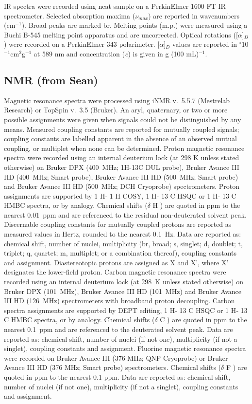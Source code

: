 IR spectra were recorded using neat sample on a PerkinElmer 1600 FT IR spectrometer. Selected absorption maxima ($\nu_{max}$) are reported in wavenumbers (cm$^{-1}$). Broad peaks are marked br.
Melting points (m.p.) were measured using a Buchi B-545 melting point apparatus and are uncorrected. 
Optical rotations ([$\alpha$]$_D$) were recorded on a PerkinElmer 343 polarimeter. [$\alpha$]$_D$ values are reported in $^{\circ}$10$^{-1}$cm$^2$g$^{-1}$ at 589 nm and concentration (\textit{c}) is given in g (100 mL)$^{-1}$. 

\subsection{NMR (from Sean)}

Magnetic resonance spectra were processed using iNMR v. 5.5.7 (Mestrelab Research) or
TopSpin v. 3.5 (Bruker). An aryl, quaternary, or two or more possible assignments were
given when signals could not be distinguished by any means. Measured coupling
constants are reported for mutually coupled signals; coupling constants are labelled
apparent in the absence of an observed mutual coupling, or multiplet when none can
be determined.
Proton magnetic resonance spectra were recorded using an internal deuterium lock (at
298 K unless stated otherwise) on Bruker DPX (400 MHz; 1H-13C DUL probe), Bruker
Avance III HD (400 MHz; Smart probe), Bruker Avance III HD (500 MHz; Smart probe)
and Bruker Avance III HD (500 MHz; DCH Cryoprobe) spectrometers. Proton assignments
are supported by 1 H‑ 1 H COSY, 1 H‑ 13 C HSQC or 1 H‑ 13 C HMBC spectra, or by analogy.
Chemical shifts ($\delta$ H ) are quoted in ppm to the nearest 0.01 ppm and are referenced to
the residual non‑deuterated solvent peak. Discernable coupling constants for mutually
coupled protons are reported as measured values in Hertz, rounded to the nearest
0.1 Hz. Data are reported as: chemical shift, number of nuclei, multiplicity (br, broad; s,
singlet; d, doublet; t, triplet; q, quartet; m, multiplet; or a combination thereof),
coupling constants and assignment. Diastereotopic protons are assigned as X and X’,
where X’ designates the lower‑field proton.
Carbon magnetic resonance spectra were recorded using an internal deuterium lock (at
298 K unless stated otherwise) on Bruker DPX (101 MHz), Bruker Avance III HD
(101 MHz) and Bruker Avance III HD (126 MHz) spectrometers with broadband proton
decoupling. Carbon spectra assignments are supported by DEPT editing, 1 H‑ 13 C HSQC or
1 H‑ 13 C HMBC spectra, or by analogy. Chemical shifts ($\delta$ C ) are quoted in ppm to the
nearest 0.1 ppm and are referenced to the deuterated solvent peak. Data are reported
as: chemical shift, number of nuclei (if not one), multiplicity (if not a singlet), coupling
constants and assignment.
Fluorine magnetic resonance spectra were recorded on Bruker Avance III (376 MHz;
QNP Cryoprobe) or Bruker Avance III HD (376 MHz; Smart probe) spectrometers.
Chemical shifts ($\delta$ F ) are quoted in ppm to the nearest 0.1 ppm. Data are reported as:
chemical shift, number of nuclei (if not one), multiplicity (if not a singlet), coupling
constants and assignment.

